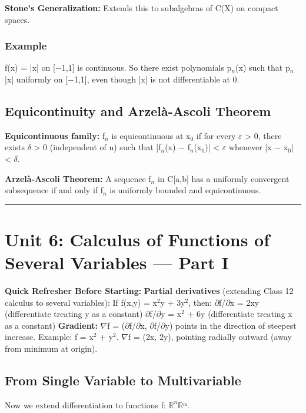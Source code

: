 \documentclass[12pt,a4paper,openany]{book}
\begin{document}
{{\textbf{Stone's Generalization:} Extends this to subalgebras of C(X) on compact spaces.

\subsubsection{Example}
f(x) = |x| on [−1,1] is continuous. So there exist polynomials p$_n$(x) such that p$_n$  |x| uniformly on [−1,1], even though |x| is not differentiable at 0.

\subsection{Equicontinuity and Arzelà-Ascoli Theorem }

\textbf{Equicontinuous family:} {f$_n$} is equicontinuous at x$_0$ if for every $\varepsilon$ > 0, there exists $\delta$ > 0 (independent of n) such that |f$_n$(x) − f$_n$(x$_0$)| < $\varepsilon$ whenever |x − x$_0$| < $\delta$.

\textbf{Arzelà-Ascoli Theorem:} A sequence {f$_n$} in C[a,b] has a uniformly convergent subsequence if and only if {f$_n$} is uniformly bounded and equicontinuous.

\bigskip\noindent\rule{\textwidth}{0.4pt}\bigskip

\section{Unit 6: Calculus of Functions of Several Variables — Part I}

\begin{prereqbox}
 \textbf{Quick Refresher Before Starting:}
\textbf{Partial derivatives} (extending Class 12 calculus to several variables):
If f(x,y) = x$^2$y + 3y$^2$, then:
$\partial$f/$\partial$x = 2xy (differentiate treating y as a constant)
$\partial$f/$\partial$y = x$^2$ + 6y (differentiate treating x as a constant)
\textbf{Gradient:} $\nabla$f = ($\partial$f/$\partial$x, $\partial$f/$\partial$y) points in the direction of steepest increase.
Example: f = x$^2$ + y$^2$. $\nabla$f = (2x, 2y), pointing radially outward (away from minimum at origin).
\end{prereqbox}


\subsection{From Single Variable to Multivariable}

Now we extend differentiation to functions f: $\mathbb{R}^n\mathbb{R}$ᵐ.

}}
\end{document}
